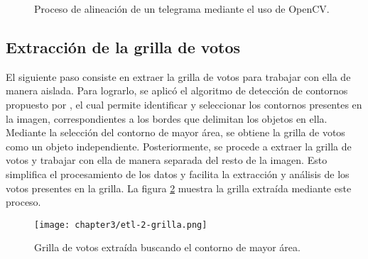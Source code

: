 \begin{figure}[H]
    \centering



    \caption[Alineación de un telegrama]{Proceso de alineación de un telegrama mediante el uso de OpenCV.}
    \label{fig:etl-1-rotacion}
\end{figure}

\subsection{Extracción de la grilla de votos}

El siguiente paso consiste en extraer la grilla de votos para trabajar con ella de manera aislada. Para lograrlo, se
aplicó el algoritmo de detección de contornos propuesto por \citet{suzuki1985topological}, el cual permite identificar
y seleccionar los contornos presentes en la imagen, correspondientes a los bordes que delimitan los objetos en ella.
Mediante la selección del contorno de mayor área, se obtiene la grilla de votos como un objeto independiente.
Posteriormente, se procede a extraer la grilla de votos y trabajar con ella de manera separada del resto de la imagen.
Esto simplifica el procesamiento de los datos y facilita la extracción y análisis de los votos presentes en la grilla.
La figura \ref{fig:etl-2-grilla} muestra la grilla extraída mediante este proceso.

\begin{figure}[H]
    \centering
    \texttt{[image: chapter3/etl-2-grilla.png]}
    \caption[Grilla de votos detectada]{Grilla de votos extraída buscando el contorno de mayor área.}
    \label{fig:etl-2-grilla}
\end{figure}

